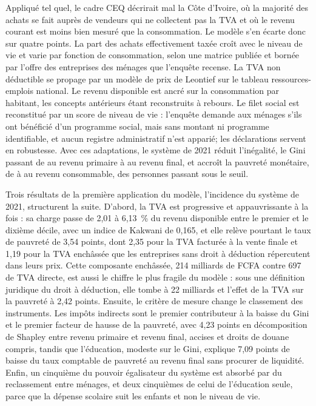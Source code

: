 \documentclass[11pt,a4paper]{article}
\begin{document}
Appliqué tel quel, le cadre CEQ décrirait mal la Côte d'Ivoire, où la majorité des achats se fait auprès de vendeurs qui ne collectent pas la TVA et où le revenu courant est moins bien mesuré que la consommation. Le modèle s'en écarte donc sur quatre points. La part des achats effectivement taxée croît avec le niveau de vie et varie par fonction de consommation, selon une matrice publiée et bornée par l'offre des entreprises des ménages que l'enquête recense. La TVA non déductible se propage par un modèle de prix de Leontief sur le tableau ressources-emplois national. Le revenu disponible est ancré sur la consommation par habitant, les concepts antérieurs étant reconstruits à rebours. Le filet social est reconstitué par un score de niveau de vie : l'enquête demande aux ménages s'ils ont bénéficié d'un programme social, mais sans montant ni programme identifiable, et aucun registre administratif n'est apparié; les déclarations servent en robustesse. Avec ces adaptations, le système de 2021 réduit l'inégalité, le Gini passant de \GiniPrimaire{} au revenu primaire à \GiniFinal{} au revenu final, et accroît la pauvreté monétaire, de \PauvretePrimaire{} à \PauvreteConsommable{} au revenu consommable, \PartNouveauxPauvres{} des personnes passant sous le seuil.

Trois résultats de la première application du modèle, l'incidence du système de 2021, structurent la suite. D'abord, la TVA est progressive et appauvrissante à la fois : sa charge passe de 2,01 à 6,13~\% du revenu disponible entre le premier et le dixième décile, avec un indice de Kakwani de 0,165, et elle relève pourtant le taux de pauvreté de 3,54 points, dont 2,35 pour la TVA facturée à la vente finale et 1,19 pour la TVA enchâssée que les entreprises sans droit à déduction répercutent dans leurs prix. Cette composante enchâssée, 214 milliards de FCFA contre 697 de TVA directe, est aussi le chiffre le plus fragile du modèle : sous une définition juridique du droit à déduction, elle tombe à 22 milliards et l'effet de la TVA sur la pauvreté à 2,42 points. Ensuite, le critère de mesure change le classement des instruments. Les impôts indirects sont le premier contributeur à la baisse du Gini et le premier facteur de hausse de la pauvreté, avec 4,23 points en décomposition de Shapley entre revenu primaire et revenu final, accises et droits de douane compris, tandis que l'éducation, modeste sur le Gini, explique 7,09 points de baisse du taux comptable de pauvreté au revenu final sans procurer de liquidité. Enfin, un cinquième du pouvoir égalisateur du système est absorbé par du reclassement entre ménages, et deux cinquièmes de celui de l'éducation seule, parce que la dépense scolaire suit les enfants et non le niveau de vie.
\end{document}
